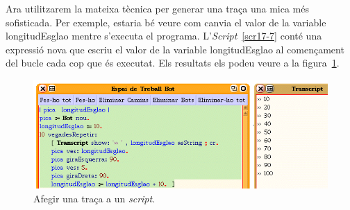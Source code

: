 Ara utilitzarem la mateixa tècnica per generar una traça una mica més sofisticada. Per exemple, estaria bé veure com canvia el valor de la variable \textsf{longitudEsglao} mentre s'executa el programa. L'\emph{Script}~\ref{scr17-7} conté una expressió nova que escriu el valor de la variable \textsf{longitudEsglao} al començament del bucle cada cop que és executat. Els resultats els podeu veure a la figura~\ref{fig1704}.
\begin{figure}[h!]
\begin{center}
\includegraphics[scale=2.5]{Imatges/figura17-4.png}
\end{center}
\caption{Afegir una traça a un \emph{script}.}
\label{fig1704}
\end{figure}


